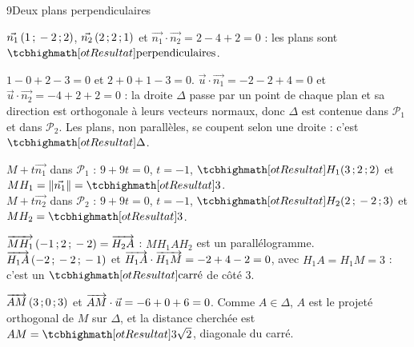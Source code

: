\begin{deuxcolonnes}
\begin{corrige}{9}{Deux plans perpendiculaires}
\begin{questions}
  \item $\vec{n_1}\,(1\,{;}\,-2\,{;}\,2)$, $\vec{n_2}\,(2\,{;}\,2\,{;}\,1)$ et $\vec{n_1}\cdot\vec{n_2}=2-4+2=0$ : les plans sont
    $\res{\text{perpendiculaires}}$.
  \item $1-0+2-3=0$ et $2+0+1-3=0$. $\vec u\cdot\vec{n_1}=-2-2+4=0$ et $\vec u\cdot\vec{n_2}=-4+2+2=0$ : la droite $\Delta$ passe par
    un point de chaque plan et sa direction est orthogonale à leurs vecteurs normaux, donc $\Delta$ est contenue dans
    $\mathcal{P}_1$ et dans $\mathcal{P}_2$. Les plans, non parallèles, se coupent selon une droite : c'est $\res{\Delta}$.
  \item $M+t\vec{n_1}$ dans $\mathcal{P}_1$ : $9+9t=0$, $t=-1$, $\res{H_1(3\pv2\pv2)}$ et $MH_1=\norme{\vec{n_1}}=\res3$.\\
    $M+t\vec{n_2}$ dans $\mathcal{P}_2$ : $9+9t=0$, $t=-1$, $\res{H_2(2\pv-2\pv3)}$ et $MH_2=\res3$.
  \item $\overrightarrow{MH_1}\,(-1\,{;}\,2\,{;}\,-2)=\overrightarrow{H_2A}$ : $MH_1AH_2$ est un parallélogramme. $\overrightarrow{H_1A}\,(-2\,{;}\,-2\,{;}\,-1)$ et
    $\overrightarrow{H_1A}\cdot\overrightarrow{H_1M}=-2+4-2=0$, avec $H_1A=H_1M=3$ : c'est un $\res{\text{carré}}$ de côté $3$.
  \item $\overrightarrow{AM}\,(3\,{;}\,0\,{;}\,3)$ et $\overrightarrow{AM}\cdot\vec u=-6+0+6=0$. Comme $A\in\Delta$, $A$ est le projeté orthogonal de $M$
    sur $\Delta$, et la distance cherchée est $AM=\res{3\sqrt2}$, diagonale du carré.
\end{questions}
\end{corrige}

\end{deuxcolonnes}

